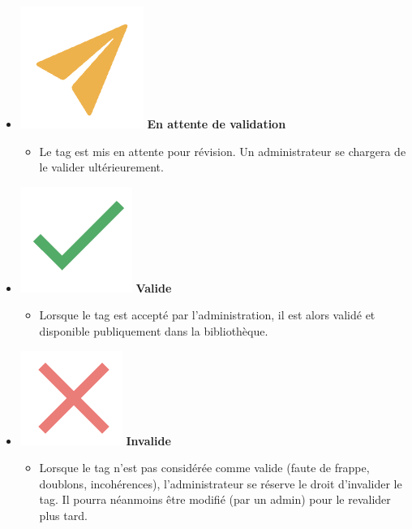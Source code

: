 \begin{itemize}
    \item \includegraphics[valign=b,height=1.4\fontcharht\font`X]{images/client/pending.png} \textbf{En attente de validation}
    \begin{itemize}
        \item Le \gls{tag} est mis en attente pour révision. Un administrateur se chargera de le valider ultérieurement.
    \end{itemize}
    \item \includegraphics[valign=b,height=1.4\fontcharht\font`X]{images/client/validated.png} \textbf{Valide}
    \begin{itemize}
        \item Lorsque le \gls{tag} est accepté par l'administration, il est alors validé et disponible publiquement dans la bibliothèque.
    \end{itemize} 
    \item \includegraphics[valign=b,height=1.4\fontcharht\font`X]{images/client/not-validated.png} \textbf{Invalide}
    \begin{itemize}
        \item Lorsque le \gls{tag} n'est pas considérée comme valide (faute de frappe, doublons, incohérences), l'administrateur se réserve le droit d'invalider le tag. Il pourra néanmoins être modifié (par un admin) pour le revalider plus tard.
    \end{itemize}

\end{itemize}
